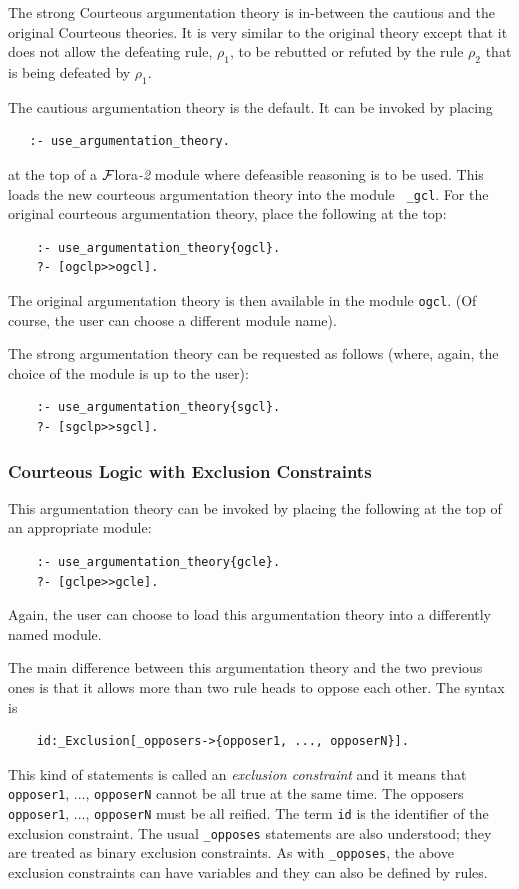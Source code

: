 \documentclass[11pt]{article}
\newcommand{\FLORA}{{\mbox{\sc ${\cal F}${lora}\rm\emph{-2}}}\xspace}
\begin{document}
The strong Courteous argumentation theory is in-between the cautious and
the original Courteous theories. It is very similar to the original theory except that it
does not allow the defeating rule, $\rho_1$, to be rebutted or refuted by the 
rule $\rho_2$ that is being defeated by $\rho_1$.

The cautious argumentation theory is the default. It can be invoked by placing
\begin{verbatim}
   :- use_argumentation_theory.
\end{verbatim}
at the top of a \FLORA module where defeasible reasoning is to be used.
This loads the new courteous argumentation theory into the module {\tt
  \_gcl}. For the original courteous argumentation theory, place the
following at the top:
\begin{verbatim}
    :- use_argumentation_theory{ogcl}.
    ?- [ogclp>>ogcl].
\end{verbatim}
The original argumentation theory is then available in the module {\tt ogcl}.
(Of course, the user can choose a different module name).

The strong argumentation theory can be requested as follows (where, again,
the choice of the module is up to the user):
\begin{verbatim}
    :- use_argumentation_theory{sgcl}.
    ?- [sgclp>>sgcl].
\end{verbatim}

\subsubsection{Courteous Logic with Exclusion Constraints}

This argumentation theory can be invoked by placing the following at the
top of an appropriate module:
\begin{verbatim}
    :- use_argumentation_theory{gcle}.
    ?- [gclpe>>gcle].
\end{verbatim}
Again, the user can choose to load this argumentation theory into a
differently named module.

The main difference between this argumentation theory and the two previous
ones is that it allows more than two rule heads to oppose each other.
The syntax is
\begin{verbatim}
    id:_Exclusion[_opposers->{opposer1, ..., opposerN}].
\end{verbatim}
This kind of statements is called an \emph{exclusion constraint} and it
means that {\tt opposer1}, ..., {\tt opposerN} cannot be all true    
at the same time. The opposers {\tt opposer1}, ..., {\tt opposerN} must be
all reified. The term {\tt id} is the identifier of the
exclusion constraint.
The usual {\tt \_opposes} statements are also understood; they are
treated as binary exclusion constraints.
As with {\tt \_opposes}, the above exclusion constraints can have variables
and they can also be defined by rules.
\end{document}
